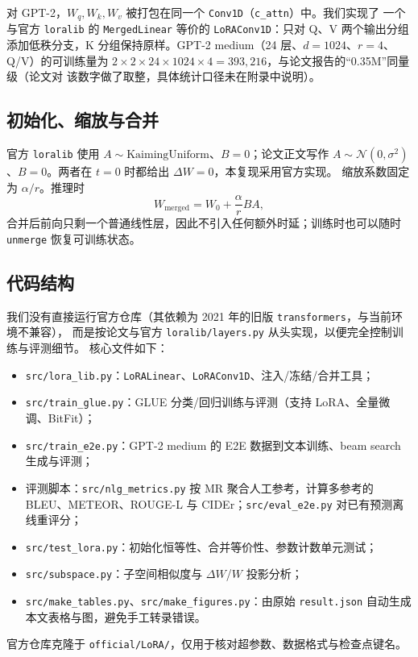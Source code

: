 \documentclass[11pt,a4paper]{ctexart}
\begin{document}
对 GPT-2，$W_q,W_k,W_v$ 被打包在同一个 \texttt{Conv1D}（\texttt{c\_attn}）中。我们实现了
一个与官方 \texttt{loralib} 的 \texttt{MergedLinear} 等价的 \texttt{LoRAConv1D}：只对
Q、V 两个输出分组添加低秩分支，K 分组保持原样。GPT-2 medium（24 层、$d=1024$、$r=4$、
Q/V）的可训练量为
$2\times 2\times 24\times 1024\times 4 = 393{,}216$，与论文报告的“0.35M”同量级（论文对
该数字做了取整，具体统计口径未在附录中说明）。

\subsection{初始化、缩放与合并}
官方 \texttt{loralib} 使用 $A\sim\text{KaimingUniform}$、$B=0$；论文正文写作
$A\sim\mathcal N(0,\sigma^2)$、$B=0$。两者在 $t=0$ 时都给出 $\Delta W=0$，本复现采用官方实现。
缩放系数固定为 $\alpha/r$。推理时
\begin{equation}
W_{\text{merged}} = W_0 + \frac{\alpha}{r}BA,
\end{equation}
合并后前向只剩一个普通线性层，因此不引入任何额外时延；训练时也可以随时 \texttt{unmerge}
恢复可训练状态。

\subsection{代码结构}
我们没有直接运行官方仓库（其依赖为 2021 年的旧版 \texttt{transformers}，与当前环境不兼容），
而是按论文与官方 \texttt{loralib/layers.py} 从头实现，以便完全控制训练与评测细节。
核心文件如下：
\begin{itemize}
  \item \texttt{src/lora\_lib.py}：\texttt{LoRALinear}、\texttt{LoRAConv1D}、注入/冻结/合并工具；
  \item \texttt{src/train\_glue.py}：GLUE 分类/回归训练与评测（支持 LoRA、全量微调、BitFit）；
  \item \texttt{src/train\_e2e.py}：GPT-2 medium 的 E2E 数据到文本训练、beam search 生成与评测；
  \item 评测脚本：\texttt{src/nlg\_metrics.py} 按 MR 聚合人工参考，计算多参考的
        BLEU、METEOR、ROUGE-L 与 CIDEr；\texttt{src/eval\_e2e.py} 对已有预测离线重评分；
  \item \texttt{src/test\_lora.py}：初始化恒等性、合并等价性、参数计数单元测试；
  \item \texttt{src/subspace.py}：子空间相似度与 $\Delta W$/$W$ 投影分析；
  \item \texttt{src/make\_tables.py}、\texttt{src/make\_figures.py}：由原始 \texttt{result.json}
        自动生成本文表格与图，避免手工转录错误。
\end{itemize}
官方仓库克隆于 \texttt{official/LoRA/}，仅用于核对超参数、数据格式与检查点键名。
\end{document}
